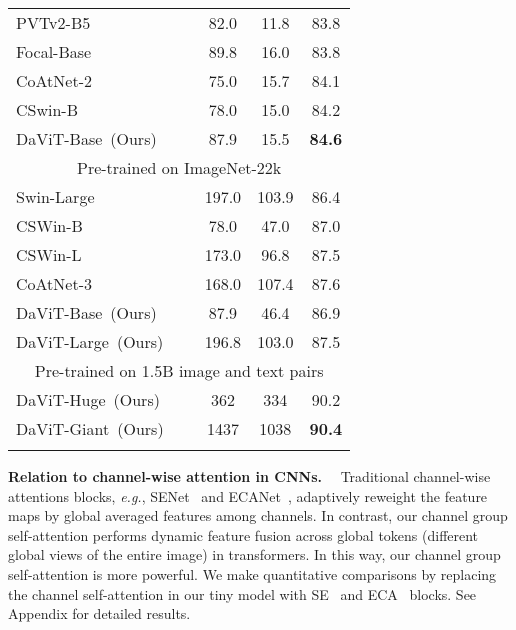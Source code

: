 \documentclass[runningheads]{llncs}
\newcommand{\eg}{\emph{e.g.}}
\newcommand{\modelInTable}{DaViT\xspace}
\newlength\savewidth
\newcommand\shline{\noalign{\global\savewidth\arrayrulewidth
  \global\arrayrulewidth 1pt}\hline\noalign{\global\arrayrulewidth\savewidth}}
\begin{document}
\begin{table}[t]
{\begin{tabular}{l|ccc}
    PVTv2-B5~\cite{wang2021pvtv2} & 82.0 & 11.8 & 83.8\\
    Focal-Base~\cite{yang2021focal}  & 89.8 & 16.0 & 83.8 \\
    CoAtNet-2~\cite{dai2021coatnet} & 75.0 & 15.7 & 84.1 \\
    CSwin-B~\cite{dong2021cswin} & 78.0 & 15.0 & 84.2 \\
    \rowcolor{Gray}
    \modelInTable-Base~(Ours)~~~~\hspace{1.5pt} & 87.9 & 15.5 & \textbf{84.6} \\
\hline
    \multicolumn{4}{c}{\small Pre-trained on ImageNet-22k} \\
    \hline
Swin-Large~\cite{liu2021swin}  & 197.0 & 103.9 & 86.4 \\
    CSWin-B~\cite{dong2021cswin}  & 78.0 & 47.0 & 87.0 \\
    CSWin-L~\cite{dong2021cswin}  & 173.0 & 96.8 & 87.5 \\
    CoAtNet-3~\cite{dai2021coatnet}  & 168.0 & 107.4 & 87.6 \\
\rowcolor{Gray}
    \modelInTable-Base~(Ours)  & 87.9 & 46.4 & 86.9 \\
    \rowcolor{Gray}
    \modelInTable-Large~(Ours)  & 196.8 & 103.0 & 87.5 \\
\hline
    \multicolumn{4}{c}{\small Pre-trained on 1.5B image and text pairs} \\
    \hline
    \rowcolor{Gray}
    \modelInTable-Huge~(Ours)  & 362& 334& 90.2 \\
    \rowcolor{Gray}
    \modelInTable-Giant~(Ours)  & 1437&1038 & \textbf{90.4} \\
    \hline
    \shline
    \end{tabular}
    }
    \label{tab:image_classification}
    \vspace{-8pt}
\end{table} 
\noindent \textbf{Relation to channel-wise attention in CNNs.}~~
Traditional channel-wise attentions blocks, \eg, SENet~\cite{hu2018squeeze} and ECANet~\cite{wang2020eca}, adaptively reweight the feature maps by global averaged features among channels. In contrast, our channel group self-attention performs dynamic feature fusion across global tokens (different global views of the entire image) in transformers.
In this way, our channel group self-attention is more powerful. We make quantitative comparisons by replacing the channel self-attention in our tiny model with SE~\cite{hu2018squeeze} and ECA~\cite{wang2020eca} blocks. See Appendix for detailed results.
 
\end{document}
